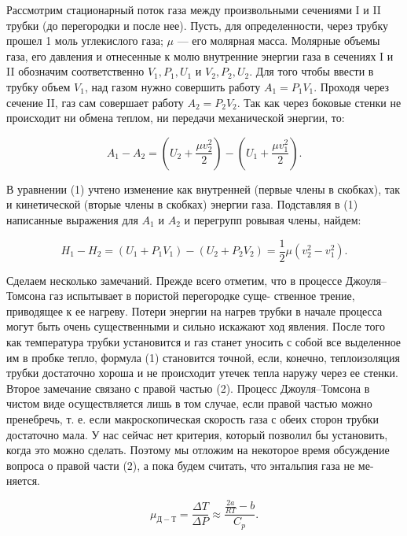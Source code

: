 Рассмотрим стационарный поток газа между произвольными сечениями I и II трубки (до перегородки и после нее). Пусть, для определенности, через трубку прошел 1 моль углекислого газа; $\mu$ --- его молярная масса. Молярные объемы газа, его давления и отнесенные к молю внутренние энергии газа в сечениях I и II обозначим соответственно $V_1, P_1, U_1$ и $V_2, P_2, U_2$. Для того чтобы ввести в трубку объем $V_1$, над газом нужно совершить работу $A_1 = P_1V_1$. Проходя через сечение II, газ сам совершает работу $A_2 = P_2V_2$. Так как через боковые стенки не происходит ни обмена теплом, ни передачи механической энергии, то:

\begin{equation}
A_1 - A_2 = \left(U_2 + \dfrac{\mu v_2^2}{2}\right) - \left(U_1 + \dfrac{\mu v_1^2}{2}\right).
\end{equation}

В уравнении (1) учтено изменение как внутренней (первые члены в скобках), так и кинетической (вторые члены в скобках) энергии газа. Подставляя в (1) написанные выражения для $A_1$ и $A_2$ и перегрупп ровывая члены, найдем:

\begin{equation}
H_1 - H_2 = (U_1 + P_1V_1) - (U_2 + P_2V_2) = \dfrac{1}{2} \mu (v_2^2 - v_1^2).
\end{equation}

Сделаем несколько замечаний. Прежде всего отметим, что в процессе Джоуля–Томсона газ испытывает в пористой перегородке суще- ственное трение, приводящее к ее нагреву. Потери энергии на нагрев трубки в начале процесса могут быть очень существенными и сильно искажают ход явления. После того как температура трубки установится и газ станет уносить с собой все выделенное им в пробке тепло, формула (1) становится точной, если, конечно, теплоизоляция трубки достаточно хороша и не происходит утечек тепла наружу через ее стенки.\\

Второе замечание связано с правой частью (2). Процесс Джоуля–Томсона в чистом виде осуществляется лишь в том случае, если правой частью можно пренебречь, т. е. если макроскопическая скорость газа с обеих сторон трубки достаточно мала. У нас сейчас нет критерия, который позволил бы установить, когда это можно сделать. Поэтому мы отложим на некоторое время обсуждение вопроса о правой части (2), а пока будем считать, что энтальпия газа не ме- няется.

\begin{equation}
\mu_{Д-Т} = \dfrac{\Delta T}{\Delta P} \approx \dfrac{\frac{2a}{RT}-b}{C_p}.
\end{equation}

